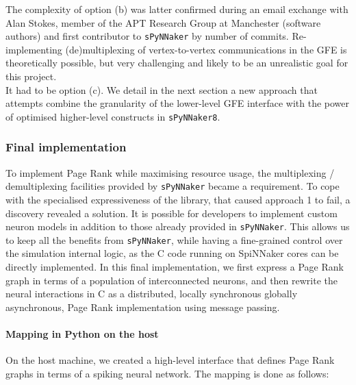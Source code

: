 The complexity of option (b) was latter confirmed during an email exchange with Alan Stokes, member of the APT Research Group at Manchester (software authors) and first contributor to \texttt{sPyNNaker} by number of commits. Re-implementing (de)multiplexing of vertex-to-vertex communications in the GFE is theoretically possible, but very challenging and likely to be an unrealistic goal for this project. \\

It had to be option (c). We detail in the next section a new approach that attempts combine the granularity of the lower-level GFE interface with the power of optimised higher-level constructs in \texttt{sPyNNaker8}.


\subsubsection{Final implementation} \label{sec:implementation}

To implement Page Rank while maximising resource usage, the multiplexing / demultiplexing facilities provided by \texttt{sPyNNaker} became a requirement. To cope with the specialised expressiveness of the library, that caused approach 1 to fail, a discovery revealed a solution. It is possible for developers to implement custom neuron models in addition to those already provided in \texttt{sPyNNaker}. This allows us to keep all the benefits from \texttt{sPyNNaker}, while having a fine-grained control over the simulation internal logic, as the C code running on SpiNNaker cores can be directly implemented. In this final implementation, we first express a Page Rank graph in terms of a population of interconnected neurons, and then rewrite the neural interactions in C as a distributed, locally synchronous globally asynchronous, Page Rank implementation using message passing. 


\paragraph{Mapping in Python on the host}

On the host machine, we created a high-level interface that defines Page Rank graphs in terms of a spiking neural network. The mapping is done as follows:

